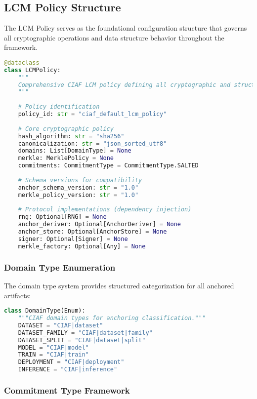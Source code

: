 \documentclass[12pt,a4paper]{article}
\begin{document}
\subsection{LCM Policy Structure}

The LCM Policy serves as the foundational configuration structure that governs all cryptographic operations and data structure behavior throughout the framework.

\begin{lstlisting}[language=Python, caption=LCM Policy Data Structure]
@dataclass  
class LCMPolicy:
    """
    Comprehensive CIAF LCM policy defining all cryptographic and structural policies.
    """
    
    # Policy identification
    policy_id: str = "ciaf_default_lcm_policy"
    
    # Core cryptographic policy
    hash_algorithm: str = "sha256"
    canonicalization: str = "json_sorted_utf8"
    domains: List[DomainType] = None
    merkle: MerklePolicy = None
    commitments: CommitmentType = CommitmentType.SALTED
    
    # Schema versions for compatibility
    anchor_schema_version: str = "1.0"
    merkle_policy_version: str = "1.0"
    
    # Protocol implementations (dependency injection)
    rng: Optional[RNG] = None
    anchor_deriver: Optional[AnchorDeriver] = None
    anchor_store: Optional[AnchorStore] = None
    signer: Optional[Signer] = None
    merkle_factory: Optional[Any] = None
\end{lstlisting}

\subsubsection{Domain Type Enumeration}

The domain type system provides structured categorization for all anchored artifacts:

\begin{lstlisting}[language=Python, caption=Domain Type Enumeration]
class DomainType(Enum):
    """CIAF domain types for anchoring classification."""
    DATASET = "CIAF|dataset"
    DATASET_FAMILY = "CIAF|dataset|family"
    DATASET_SPLIT = "CIAF|dataset|split"
    MODEL = "CIAF|model" 
    TRAIN = "CIAF|train"
    DEPLOYMENT = "CIAF|deployment"
    INFERENCE = "CIAF|inference"
\end{lstlisting}

\subsubsection{Commitment Type Framework}
\end{document}
